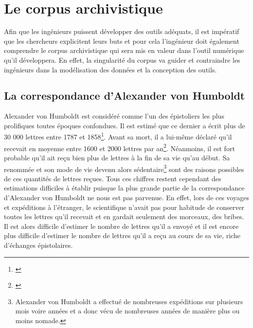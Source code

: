 \documentclass[a4paper, 12pt, twoside]{book}
\begin{document}
\section{Le corpus archivistique}
Afin que les ingénieurs puissent développer des outils adéquats, il est impératif que les chercheurs explicitent leurs buts et pour cela l'ingénieur doit également comprendre le corpus archivistique qui sera mis en valeur dans l'outil numérique qu'il développera. En effet, la singularité du corpus va guider et contraindre les ingénieurs dans la modélisation des données et la conception des outils.

\subsection{La correspondance d'Alexander von Humboldt}
Alexander von Humboldt est considéré comme l'un des épistoliers les plus prolifiques  toutes époques confondues. Il est estimé que ce dernier a écrit plus de 30 000 lettres entre 1787 et 1858\footnote{\cite{schwarz_korrespondenz_2018}}. Avant sa mort, il a lui-même déclaré qu'il recevait en moyenne entre 1600 et 2000 lettres par an\footnote{\cite{biermann_alexander-von-humboldt-briefausgabe_1962}}. Néanmoins, il est fort probable qu'il ait reçu bien plus de lettres à la fin de sa vie qu'au début. Sa renommée et son mode de vie devenu alors sédentaire\footnote{Alexander von Humboldt a effectué de nombreuses expéditions sur plusieurs mois voire années et a donc vécu de nombreuses années de manière plus ou moins nomade. } sont des raisons possibles de ces quantités de lettres reçues. Tous ces chiffres restent cependant des estimations difficiles à établir puisque la plus grande partie de la correspondance d'Alexander von Humboldt ne nous est pas parvenue. En effet, lors de ces voyages et expéditions à l'étranger, le scientifique n'avait pas pour habitude de conserver toutes les lettres qu'il recevait et en gardait seulement des morceaux, des bribes. Il est alors difficile d'estimer le nombre de lettres qu'il a envoyé et il est encore plus difficile d'estimer le nombre de lettres qu'il a reçu au cours de sa vie, riche d'échanges épistolaires.
\end{document}
